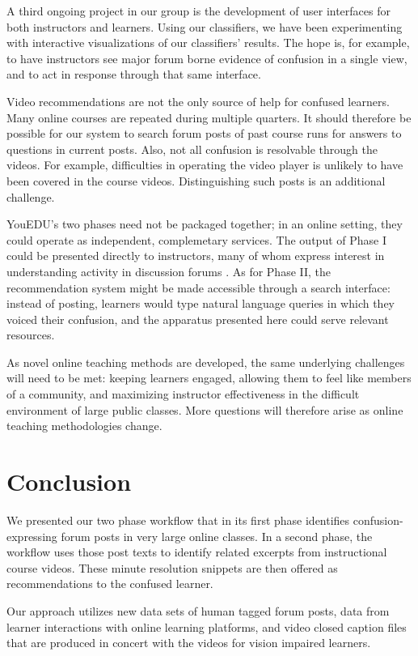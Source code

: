 \documentclass{edm_template}
\begin{document}
A third ongoing project in our group is the development of user
interfaces for both instructors and learners. Using our classifiers,
we have been experimenting with interactive visualizations of our
classifiers' results. The hope is, for example, to have instructors
see major forum borne evidence of confusion in a single view, and to
act in response through that same interface.

Video recommendations are not the only source of help for confused
learners. Many online courses are repeated during multiple
quarters. It should therefore be possible for our system to search
forum posts of past course runs for answers to questions in current
posts.  Also, not all confusion is resolvable through the videos. For
example, difficulties in operating the video player is unlikely to
have been covered in the course videos. Distinguishing such posts is
an additional challenge.

YouEDU's two phases need not be packaged together; in an online
setting, they could operate as independent, complemetary services. The
output of Phase I could be presented directly to instructors, many of
whom express interest in understanding activity in discussion forums
\cite{Stephens-Martinez:2014:MMI:2556325.2566246}. As for Phase II,
the recommendation system might be made accessible through a search
interface: instead of posting, learners would type natural language
queries in which they voiced their confusion, and the apparatus
presented here could serve relevant resources.

As novel online teaching methods are developed, the same underlying
challenges will need to be met: keeping learners engaged, allowing
them to feel like members of a community, and maximizing instructor
effectiveness in the difficult environment of large public classes.
More questions will therefore arise as online teaching methodologies
change.

\section{Conclusion}
\label{sec:conclusion}
We presented our two phase workflow that in its first phase identifies
confusion-expressing forum posts in very large online classes. In a
second phase, the workflow uses those post texts to identify related
excerpts from instructional course videos. These minute resolution
snippets are then offered as recommendations to the confused learner.

Our approach utilizes new data sets of human tagged forum posts, data
from learner interactions with online learning platforms, and video
closed caption files that are produced in concert with the videos for
vision impaired learners.
\end{document}
